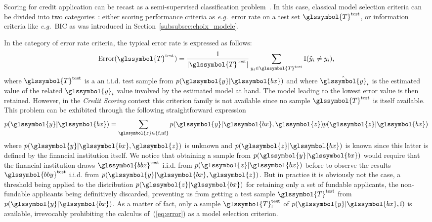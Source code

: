 Scoring for credit application can be recast as a semi-supervised classification problem~\cite{Chapelle:2010:SL:1841234}. In this case, classical model selection criteria can be divided into two categories~\cite{vandewalle:tel-00447141}: either scoring performance criteria as \textit{e.g.}\ error rate on a test set $\glssymbol{T}^{\text{test}}$, or information criteria like \textit{e.g.}\ BIC as was introduced in Section~\ref{subsubsec:choix_modele}.

In the category of error rate criteria, the typical error rate is expressed as follows:
\begin{equation} \label{eq:error}
\mbox{Error}(\glssymbol{T}^\text{test}) = \frac{1}{|\glssymbol{T}^\text{test}|} \sum_{y_i \in \glssymbol{T}^\text{test}} \mathbb{I}(\hat y_i \neq y_i),
\end{equation} 
where $\glssymbol{T}^\text{test}$ is a an i.i.d. test sample from $p(\glssymbol{y}|\glssymbol{bx})$ and where $\hat{\glssymbol{y}}_i$ is the estimated value of the related $\glssymbol{y}_i$ value involved by the estimated model at hand. The model leading to the lowest error value is then retained. However, in the \textit{Credit Scoring} context this criterion family is not available since no sample $\glssymbol{T}^\text{test}$ is itself available. This problem can be exhibited through the following straightforward expression
\begin{equation} \label{eq:error2}
p(\glssymbol{y}|\glssymbol{bx}) = \sum_{\glssymbol{z}\in\{\text{f},\text{nf}\}} p(\glssymbol{y}|\glssymbol{bx},\glssymbol{z}) p(\glssymbol{z}|\glssymbol{bx})
\end{equation}
where $p(\glssymbol{y}|\glssymbol{bx},\glssymbol{z})$ is unknown and $p(\glssymbol{z}|\glssymbol{bx})$ is known since this latter is defined by the financial institution itself. We notice that obtaining a sample from $p(\glssymbol{y}|\glssymbol{bx})$ would require that the financial institution draws $\glssymbol{bbz}^\text{test}$ i.i.d. from $p(\glssymbol{z}|\glssymbol{bx})$ before to observe the results $\glssymbol{bby}^\text{test}$ i.i.d. from $p(\glssymbol{y}|\glssymbol{bx},\glssymbol{z})$. But in practice it is obviously not the case, a threshold being applied to the distribution $p(\glssymbol{z}|\glssymbol{bx})$ for retaining only a set of fundable applicants, the non-fundable applicants being definitively discarded, preventing us from getting a test sample $\glssymbol{T}^\text{test}$ from $p(\glssymbol{y} | \glssymbol{bx})$. As a matter of fact, only a sample $\glssymbol{T}^\text{test}_{\text{f}}$ of $p(\glssymbol{y}|\glssymbol{bx},\text{f})$ is available, 
irrevocably prohibiting the calculus of~(\ref{eq:error}) as a model selection criterion.

